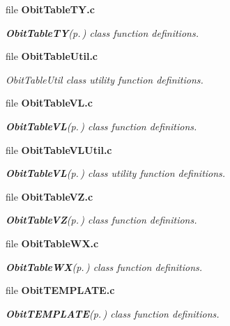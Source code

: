 \begin{CompactItemize}
\item 
file {\bf Obit\-Table\-TY.c}
\begin{CompactList}\small\item\em {\bf Obit\-Table\-TY}{\rm (p.\,\pageref{structObitTableTY})} class function definitions. \item\end{CompactList}

\item 
file {\bf Obit\-Table\-Util.c}
\begin{CompactList}\small\item\em Obit\-Table\-Util class utility function definitions. \item\end{CompactList}

\item 
file {\bf Obit\-Table\-VL.c}
\begin{CompactList}\small\item\em {\bf Obit\-Table\-VL}{\rm (p.\,\pageref{structObitTableVL})} class function definitions. \item\end{CompactList}

\item 
file {\bf Obit\-Table\-VLUtil.c}
\begin{CompactList}\small\item\em {\bf Obit\-Table\-VL}{\rm (p.\,\pageref{structObitTableVL})} class utility function definitions. \item\end{CompactList}

\item 
file {\bf Obit\-Table\-VZ.c}
\begin{CompactList}\small\item\em {\bf Obit\-Table\-VZ}{\rm (p.\,\pageref{structObitTableVZ})} class function definitions. \item\end{CompactList}

\item 
file {\bf Obit\-Table\-WX.c}
\begin{CompactList}\small\item\em {\bf Obit\-Table\-WX}{\rm (p.\,\pageref{structObitTableWX})} class function definitions. \item\end{CompactList}

\item 
file {\bf Obit\-TEMPLATE.c}
\begin{CompactList}\small\item\em {\bf Obit\-TEMPLATE}{\rm (p.\,\pageref{structObitTEMPLATE})} class function definitions. \item\end{CompactList}


\end{CompactItemize}
